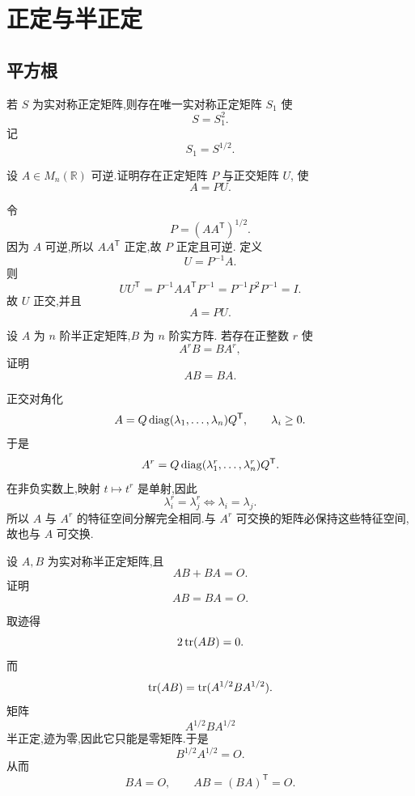 \newpage

\section{正定与半正定}

\subsection{平方根}

\begin{proposition}[\marktwostar]
若 $S$ 为实对称正定矩阵,则存在唯一实对称正定矩阵 $S_1$ 使
\[
S=S_1^2.
\]
记
\[
S_1=S^{1/2}.
\]
\end{proposition}


\begin{example}[\markstar]
设 $A\in M_n(\mathbb{R})$ 可逆.证明存在正定矩阵 $P$ 与正交矩阵 $U$,
使
\[
A=PU.
\]
\end{example}
\exampleblank

\begin{solution}
令
\[
P=(AA^{\mathsf T})^{1/2}.
\]
因为 $A$ 可逆,所以 $AA^{\mathsf T}$ 正定,故 $P$ 正定且可逆.
定义
\[
U=P^{-1}A.
\]
则
\[
UU^{\mathsf T}
=
P^{-1}AA^{\mathsf T}P^{-1}
=
P^{-1}P^2P^{-1}
=
I.
\]
故 $U$ 正交,并且
\[
\boxed{A=PU}.
\]
\end{solution}


\begin{example}
设 $A$ 为 $n$ 阶半正定矩阵,$B$ 为 $n$ 阶实方阵.
若存在正整数 $r$ 使
\[
A^rB=BA^r,
\]
证明
\[
AB=BA.
\]
\end{example}
\exampleblank

\begin{solution}
正交对角化
\[
A=Q\operatorname{diag}(\lambda_1,\ldots,\lambda_n)Q^{\mathsf T},
\qquad
\lambda_i\ge0.
\]
于是
\[
A^r
=
Q\operatorname{diag}(\lambda_1^r,\ldots,\lambda_n^r)Q^{\mathsf T}.
\]
在非负实数上,映射 $t\mapsto t^r$ 是单射,因此
\[
\lambda_i^r=\lambda_j^r
\iff
\lambda_i=\lambda_j.
\]
所以 $A$ 与 $A^r$ 的特征空间分解完全相同.与 $A^r$ 可交换的矩阵必保持这些特征空间,
故也与 $A$ 可交换.
\end{solution}


\begin{example}
设 $A,B$ 为实对称半正定矩阵,且
\[
AB+BA=O.
\]
证明
\[
AB=BA=O.
\]
\end{example}
\exampleblank

\begin{solution}
取迹得
\[
2\operatorname{tr}(AB)=0.
\]
而
\[
\operatorname{tr}(AB)
=
\operatorname{tr}(A^{1/2}BA^{1/2}).
\]
矩阵
\[
A^{1/2}BA^{1/2}
\]
半正定,迹为零,因此它只能是零矩阵.于是
\[
B^{1/2}A^{1/2}=O.
\]
从而
\[
BA=O,
\qquad
AB=(BA)^{\mathsf T}=O.
\]
\end{solution}


